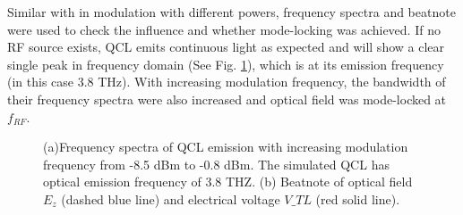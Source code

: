 \documentclass[11pt,final]{scrbook}
\begin{document}
Similar with in modulation with different powers, frequency spectra and beatnote were used to check the influence and whether mode-locking was achieved. If no RF source exists, QCL emits continuous light as expected and will show a clear single peak in frequency domain (See Fig. \ref{fig:modA_Beatnote}), which is at its emission frequency (in this case 3.8 THz). With increasing modulation frequency, the bandwidth of their frequency spectra were also increased and optical field was mode-locked at $f_{RF}$.
\begin{figure}[htbp]
  \centering
\caption{(a)Frequency spectra of QCL emission with increasing modulation frequency from -8.5 dBm to -0.8 dBm. The simulated QCL has optical emission frequency of 3.8 THZ. (b) Beatnote of optical field $E_{z}$ (dashed blue line) and electrical voltage $V\_{TL}$ (red solid line).}
\label{fig:modA_Beatnote}
\end{figure}
\end{document}
